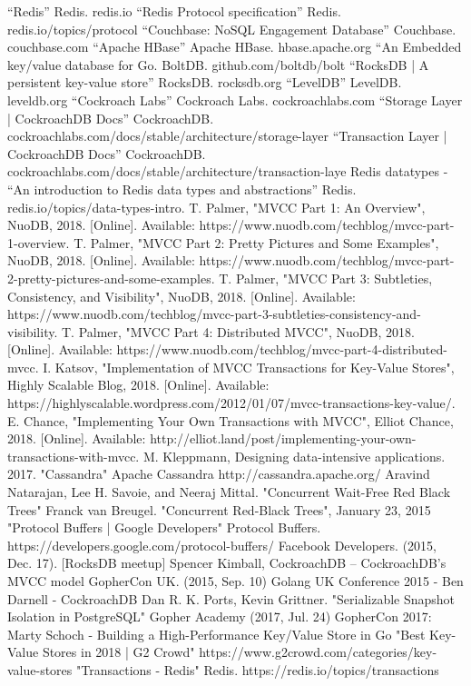 \documentclass[conference]{IEEEtran}
\begin{document}
    \begin{thebibliography}{00}
     “Redis” Redis. redis.io
     “Redis Protocol specification” Redis. redis.io/topics/protocol
     “Couchbase: NoSQL Engagement Database” Couchbase. couchbase.com
     “Apache HBase” Apache HBase. hbase.apache.org
     “An Embedded key/value database for Go. BoltDB. github.com/boltdb/bolt
     “RocksDB | A persistent key-value store” RocksDB. rocksdb.org
     “LevelDB” LevelDB. leveldb.org
     “Cockroach Labs” Cockroach Labs. cockroachlabs.com
     “Storage Layer | CockroachDB Docs” CockroachDB. cockroachlabs.com/docs/stable/architecture/storage-layer
     “Transaction Layer | CockroachDB Docs” CockroachDB. cockroachlabs.com/docs/stable/architecture/transaction-laye
     Redis datatypes - “An introduction to Redis data types and abstractions” Redis. redis.io/topics/data-types-intro.
     T. Palmer, "MVCC Part 1: An Overview", NuoDB, 2018. [Online]. Available: https://www.nuodb.com/techblog/mvcc-part-1-overview.
     T. Palmer, "MVCC Part 2: Pretty Pictures and Some Examples", NuoDB, 2018. [Online]. Available: https://www.nuodb.com/techblog/mvcc-part-2-pretty-pictures-and-some-examples.
     T. Palmer, "MVCC Part 3: Subtleties, Consistency, and Visibility", NuoDB, 2018. [Online]. Available: https://www.nuodb.com/techblog/mvcc-part-3-subtleties-consistency-and-visibility.
     T. Palmer, "MVCC Part 4: Distributed MVCC", NuoDB, 2018. [Online]. Available: https://www.nuodb.com/techblog/mvcc-part-4-distributed-mvcc.
     I. Katsov, "Implementation of MVCC Transactions for Key-Value Stores", Highly Scalable Blog, 2018. [Online]. Available: https://highlyscalable.wordpress.com/2012/01/07/mvcc-transactions-key-value/.
     E. Chance, "Implementing Your Own Transactions with MVCC", Elliot Chance, 2018. [Online]. Available: http://elliot.land/post/implementing-your-own-transactions-with-mvcc.
     M. Kleppmann, Designing data-intensive applications. 2017.
     "Cassandra" Apache Cassandra http://cassandra.apache.org/
     Aravind Natarajan, Lee H. Savoie, and Neeraj Mittal. "Concurrent Wait-Free Red Black Trees"
     Franck van Breugel. "Concurrent Red-Black Trees", January 23, 2015
     "Protocol Buffers | Google Developers" Protocol Buffers. https://developers.google.com/protocol-buffers/
     Facebook Developers. (2015, Dec. 17). [RocksDB meetup] Spencer Kimball, CockroachDB – CockroachDB’s MVCC model 
     GopherCon UK. (2015, Sep. 10) Golang UK Conference 2015 - Ben Darnell - CockroachDB
     Dan R. K. Ports, Kevin Grittner. "Serializable Snapshot Isolation in PostgreSQL" 
     Gopher Academy (2017, Jul. 24) GopherCon 2017: Marty Schoch - Building a High-Performance Key/Value Store in Go
     "Best Key-Value Stores in 2018 | G2 Crowd" https://www.g2crowd.com/categories/key-value-stores
     "Transactions - Redis" Redis. https://redis.io/topics/transactions
    \end{thebibliography}
    
\end{document}
